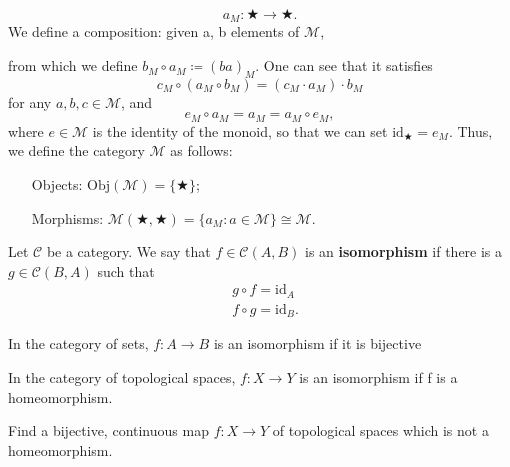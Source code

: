 \documentclass[../category_theory.tex]{subfiles}
\begin{document}
\[
	a_{M}:\bigstar\rightarrow \bigstar.
\]
We define a composition: given a, b elements of \(\mathcal{M}\),
\begin{center}
\end{center}
from which we define \(b_{M}\circ a_{M}\coloneqq (ba)_{M}\). One can see that it satisfies
\[
	c_{M}\circ (a_M\circ b_M)=(c_{M}\cdot a_{M})\cdot b_{M}
\]
for any \(a, b, c\in \mathcal{M}\), and
\[
	e_{M}\circ a_{M}=a_M=a_{M}\circ e_{M},
\]
where \(e\in \mathcal{M}\) is the identity of the monoid, so that we can set \(\mathrm{id}_{\bigstar}=e_{M}\). Thus, we define the category \(\mathcal{M}\) as follows:
\begin{itemize}
	\item[Objects:] \(\mathrm{Obj}(\mathcal{M})=\{\bigstar\}\);
	\item[Morphisms:] \(\mathcal{M}(\bigstar, \bigstar)=\{a_{M}: a\in \mathcal{M}\}\cong \mathcal{M}.\)
\end{itemize}
\begin{def*}
	Let \(\mathcal{C}\) be a category. We say that \(f\in \mathcal{C}(A, B)\) is an \textbf{isomorphism} if there is a \(g \in \mathcal{C}(B, A)\) such that
	\begin{align*}
		 & g\circ f= \mathrm{id}_{A}  \\
		 & f\circ g= \mathrm{id}_{B}.
	\end{align*}

\end{def*}
\begin{example}
	In the category of sets, \(f:A\rightarrow B\) is an isomorphism if it is bijective
\end{example}
\begin{example}
	In the category of topological spaces, \(f:X\rightarrow Y\) is an isomorphism if f is a homeomorphism.
	\begin{exr}
		Find a bijective, continuous map \(f:X\rightarrow Y\) of topological spaces which is not a homeomorphism.
	\end{exr}
\end{example}
\end{document}
